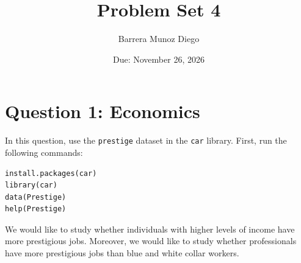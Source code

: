 \documentclass[12pt,letterpaper]{article}
\title{Problem Set 4}
\author{Barrera Munoz Diego}
\date{Due: November 26, 2026}
\begin{document}
\setlength{\abovedisplayskip}{7pt plus 2pt minus 1pt}
\setlength{\belowdisplayskip}{7pt plus 2pt minus 1pt}
\maketitle
\tableofcontents

\newpage

\section{Question 1: Economics}
\noindent In this question, use the \texttt{prestige} dataset in the \texttt{car} library. First, run the following commands:

\begin{verbatim}
install.packages(car)
library(car)
data(Prestige)
help(Prestige)
\end{verbatim}

\noindent We would like to study whether individuals with higher levels of income have more prestigious jobs. Moreover, we would like to study whether professionals have more prestigious jobs than blue and white collar workers.
\end{document}
